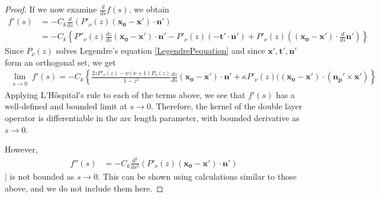 \documentclass[final]{siamltex}
\newcommand{\C}{C_k}
\begin{document}
\begin{proof}
If we now examine $\frac{d}{ds}f(s)$, we obtain
\begin{align*} f'(s)&= -\C \frac{d}{ds}\left( P'_\nu(z) (\mathbf{x_0}-\mathbf{x'})\cdot \mathbf{n}' \right)\\
&=-C_k \left\{P''_{\nu}(z) \frac{dz}{ds}(\mathbf{x_0}-\mathbf{x'})\cdot \mathbf{n}' -P
'_{\nu}(z)(-\mathbf{t'}\cdot \mathbf{n'}) + P'_\nu(z)((\mathbf{x_0}-\mathbf{x'})\cdot \frac{d}{ds}\mathbf{n}')\right\}
 \end{align*}
Since $P_\nu(z)$ solves Legendre's equation \eqref{LegendrePequation} and since $\mathbf{x'},\mathbf{t'}, \mathbf{n'}$ form an orthogonal set,   we get
 \begin{align} \lim_{\substack {s \rightarrow 0}} f'(s) =-C_k \left\{\frac{2zP'_{\nu}(z)-\nu(\nu+1)P_{\nu}(z)}{1-z^2} \frac{dz}{ds}(\mathbf{x_0}-\mathbf{x'})\cdot \mathbf{n}'  +\kappa P'_\nu(z)((\mathbf{x_0}-\mathbf{x'})\cdot (\mathbf{n_p'}\times \mathbf{x'})\right\}   \end{align}   
Applying L'H\^{o}spital's rule to each of the terms above, we see that $f'(s)$ has a well-defined and bounded limit at $s\rightarrow 0$. 
Therefore, the kernel of the double layer operator is differentiable in the arc length parameter, with bounded derivative as $s\rightarrow 0$. 

However, \begin{align*} f''(s)&= -\C \frac{d^2}{ds^2}\left( P'_\nu(z) (\mathbf{x_0}-\mathbf{x'})\cdot \mathbf{n}' \right)\end{align*}| is not bounded as $s\rightarrow 0$. This can be shown using calculations similar to those above, and we do not include them here.

\end{proof}





\end{document}
